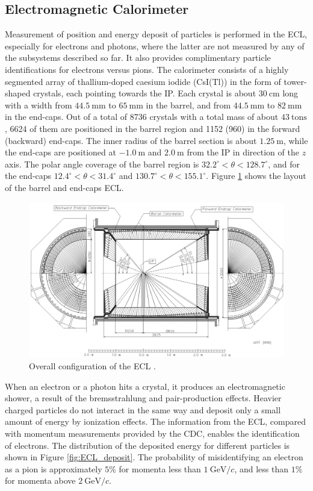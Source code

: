 \documentclass[headings=standardclasses,headings=big,oneside,a4paper,openany,12pt]{scrbook}
\newcommand {\e}[1]{\mathrm{~#1}}
\begin{document}
\subsection{Electromagnetic Calorimeter}
Measurement of position and energy deposit of particles is performed in the ECL, especially for electrons and photons, where the latter are not measured by any of the subsystems described so far. It also provides complimentary particle identifications for electrons versus pions. The calorimeter consists of a highly segmented array of thallium-doped caesium iodide (CsI(Tl)) in the form of tower-shaped crystals, each pointing towards the IP. Each crystal is about $30\e{cm}$ long with a width from $44.5\e{mm}$ to $65\e{mm}$ in the barrel, and from $44.5\e{mm}$ to $82\e{mm}$ in the end-caps. Out of a total of 8736 crystals with a total mass of about $43\e{tons}$, 6624 of them are positioned in the barrel region and 1152 (960) in the forward (backward) end-caps. The inner radius of the barrel section is about $1.25\e{m}$, while the end-caps are positioned at $-1.0\e{m}$ and $2.0\e{m}$ from the IP in direction of the $z$ axis. The polar angle coverage of the barrel region is $32.2^\circ < \theta < 128.7^\circ$, and for the end-caps $12.4^\circ < \theta < 31.4^\circ$ and $130.7^\circ < \theta < 155.1^\circ$. Figure \ref{fig:ECL_layout} shows the layout of the barrel and end-caps ECL. 
\begin{figure}[H]
	\centering
	\captionsetup{width=0.8\linewidth}
   \includegraphics[width=\linewidth]{fig/setup/ECL_layout}
	\caption{Overall configuration of the ECL \cite{ABASHIAN2002117}.}
	\label{fig:ECL_layout}
\end{figure}
When an electron or a photon hits a crystal, it produces an electromagnetic shower, a result of the bremsstrahlung and pair-production effects. Heavier charged particles do not interact in the same way and deposit only a small amount of energy by ionization effects. The information from the ECL, compared with momentum measurements provided by the CDC, enables the identification of electrons. The distribution of the deposited energy for different particles is shown in Figure \ref{fig:ECL_deposit}. The probability of misidentifying an electron as a pion is approximately $5\%$ for momenta less than $1\e{GeV}/c$, and less than $1\%$ for momenta above $2\e{GeV}/c$.
\end{document}
